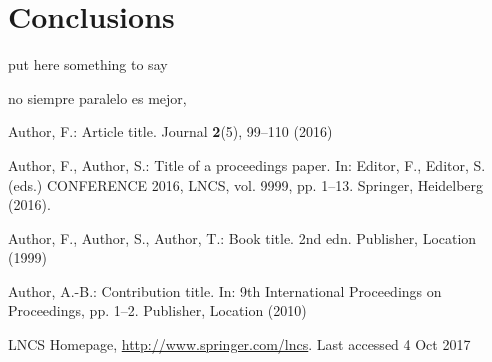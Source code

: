 \documentclass[runningheads]{llncs}
\begin{document}
\section{Conclusions}
put here something to say

no siempre paralelo es mejor, 

%
%
%
% 
% 
%
\begin{thebibliography}{8}
Author, F.: Article title. Journal \textbf{2}(5), 99--110 (2016)

Author, F., Author, S.: Title of a proceedings paper. In: Editor,
F., Editor, S. (eds.) CONFERENCE 2016, LNCS, vol. 9999, pp. 1--13.
Springer, Heidelberg (2016). 

Author, F., Author, S., Author, T.: Book title. 2nd edn. Publisher,
Location (1999)

Author, A.-B.: Contribution title. In: 9th International Proceedings
on Proceedings, pp. 1--2. Publisher, Location (2010)

LNCS Homepage, \url{http://www.springer.com/lncs}. Last accessed 4
Oct 2017
\end{thebibliography}
\end{document}
